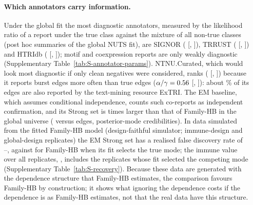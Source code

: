 \paragraph{Which annotators carry information.}
Under the global fit the most diagnostic annotators, measured by the likelihood ratio of a report under the true class against the mixture of all non-true classes (post hoc summaries of the global NUTS fit), are SIGNOR (\nLrSignor{} [\nLrSignorLo{}, \nLrSignorHi{}]), TRRUST (\nLrTrrust{} [\nLrTrrustLo{}, \nLrTrrustHi{}]) and HTRIdb (\nLrHtridb{} [\nLrHtridbLo{}, \nLrHtridbHi{}]); motif and coexpression reports are only weakly diagnostic (Supplementary Table~\ref{tab:S-annotator-params}).
NTNU.Curated, which would look most diagnostic if only clean negatives were considered, ranks \nLrNtnuRank{} (\nLrNtnu{} [\nLrNtnuLo{}, \nLrNtnuHi{}]) because it reports burst edges more often than true edges ($\alpha/\gamma=0.56{}$ [\nAgNtnuLo{}, \nAgNtnuHi{}]): about \nNtnuInExtriPct{}\% of its edges are also reported by the text-mining resource ExTRI.
The EM baseline, which assumes conditional independence, counts such co-reports as independent confirmation, and its Strong set is \nStrongRatioGlob{} times larger than that of Family-HB in the global universe (\nStrongEmGlob{} versus \nStrongHbGlob{} edges, posterior-mode credibilities).
In data simulated from the fitted Family-HB model (design-faithful simulator; \nRecNImm{} immune-design and \nRecNGlob{} global-design replicates) the EM Strong set has a realised false discovery rate of \nRecFdrEmMin{}--\nRecFdrEmMax{}, against \nRecFdrHbTruth{} for Family-HB when its fit selects the true mode; the immune value over all replicates, \nRecFdrHbImm{}, includes the \nRecNCompImm{} replicates whose fit selected the competing mode (Supplementary Table~\ref{tab:S-recovery}).
Because these data are generated with the dependence structure that Family-HB estimates, the comparison favours Family-HB by construction; it shows what ignoring the dependence costs if the dependence is as Family-HB estimates, not that the real data have this structure.

